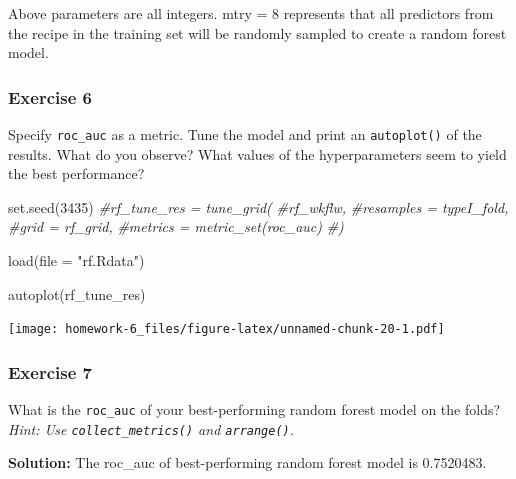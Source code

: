 \documentclass[
]{article}
\newenvironment{Shaded}{\begin{snugshade}}{\end{snugshade}}
\newcommand{\AttributeTok}[1]{\textcolor[rgb]{0.77,0.63,0.00}{#1}}
\newcommand{\CommentTok}[1]{\textcolor[rgb]{0.56,0.35,0.01}{\textit{#1}}}
\newcommand{\DecValTok}[1]{\textcolor[rgb]{0.00,0.00,0.81}{#1}}
\newcommand{\FunctionTok}[1]{\textcolor[rgb]{0.00,0.00,0.00}{#1}}
\newcommand{\NormalTok}[1]{#1}
\newcommand{\StringTok}[1]{\textcolor[rgb]{0.31,0.60,0.02}{#1}}
\begin{document}
Above parameters are all integers. mtry = 8 represents that all
predictors from the recipe in the training set will be randomly sampled
to create a random forest model.

\hypertarget{exercise-6}{%
\subsubsection{Exercise 6}\label{exercise-6}}

Specify \texttt{roc\_auc} as a metric. Tune the model and print an
\texttt{autoplot()} of the results. What do you observe? What values of
the hyperparameters seem to yield the best performance?

\begin{Shaded}
\begin{Highlighting}[]
\FunctionTok{set.seed}\NormalTok{(}\DecValTok{3435}\NormalTok{)}
\CommentTok{\#rf\_tune\_res = tune\_grid(}
  \CommentTok{\#rf\_wkflw,}
  \CommentTok{\#resamples = typeI\_fold, }
  \CommentTok{\#grid = rf\_grid,}
  \CommentTok{\#metrics = metric\_set(roc\_auc)}
\CommentTok{\#)}
\end{Highlighting}
\end{Shaded}

\begin{Shaded}
\begin{Highlighting}[]
\FunctionTok{load}\NormalTok{(}\AttributeTok{file =} \StringTok{"rf.Rdata"}\NormalTok{)}
\end{Highlighting}
\end{Shaded}

\begin{Shaded}
\begin{Highlighting}[]
\FunctionTok{autoplot}\NormalTok{(rf\_tune\_res)}
\end{Highlighting}
\end{Shaded}

\texttt{[image: homework-6\_files/figure-latex/unnamed-chunk-20-1.pdf]}

\hypertarget{exercise-7}{%
\subsubsection{Exercise 7}\label{exercise-7}}

What is the \texttt{roc\_auc} of your best-performing random forest
model on the folds? \emph{Hint: Use \texttt{collect\_metrics()} and
\texttt{arrange()}.}

\textbf{Solution: } The roc\_auc of best-performing random forest model
is 0.7520483.
\end{document}
